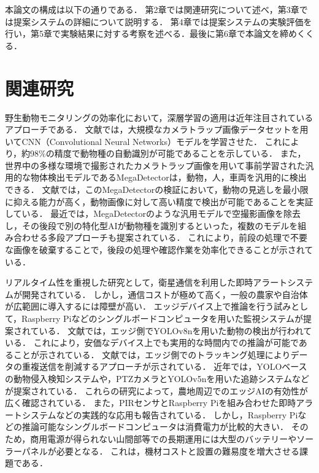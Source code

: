\documentclass[technicalreport]{ieicej}
\begin{document}
本論文の構成は以下の通りである．
第2章では関連研究について述べ，第3章では提案システムの詳細について説明する．
第4章では提案システムの実験評価を行い，第5章で実験結果に対する考察を述べる．最後に第6章で本論文を締めくくる．

\section{関連研究}

野生動物モニタリングの効率化において，深層学習の適用は近年注目されているアプローチである．
文献\cite{Tabak2019}では，大規模なカメラトラップ画像データセットを用いてCNN（Convolutional Neural Networks）モデルを学習させた．
これにより，約98\%の精度で動物種の自動識別が可能であることを示している．
また，世界中の多様な環境で撮影されたカメラトラップ画像を用いて事前学習された汎用的な物体検出モデルであるMegaDetector\cite{Beery2019}は，動物，人，車両を汎用的に検出できる．
文献\cite{Fennell2022}では，このMegaDetectorの検証において，動物の見逃しを最小限に抑える能力が高く，動物画像に対して高い精度で検出が可能であることを実証している．
最近では，MegaDetectorのような汎用モデルで空撮影画像を除去し，その後段で別の特化型AIが動物種を識別するといった，複数のモデルを組み合わせる多段アプローチも提案されている\cite{rs18030502,Mulero2025}．
これにより，前段の処理で不要な画像を破棄することで，後段の処理や確認作業を効率化できることが示されている．

リアルタイム性を重視した研究として，衛星通信を利用した即時アラートシステムが開発されている\cite{Whytock2023}．
しかし，通信コストが極めて高く，一般の農家や自治体が広範囲に導入するには障壁が高い．
エッジデバイス上で推論を行う試みとして，Raspberry Piなどのシングルボードコンピュータを用いた監視システムが提案されている\cite{Patkar2025,Computers2025}．
文献\cite{Patkar2025}では，エッジ側でYOLOv8nを用いた動物の検出が行われている．
これにより，安価なデバイス上でも実用的な時間内での推論が可能であることが示されている．
文献\cite{Computers2025}では，エッジ側でのトラッキング処理によりデータの重複送信を削減するアプローチが示されている．
近年では，YOLOベースの動物侵入検知システム\cite{10716895,11459678}や，PTZカメラとYOLOv5nを用いた追跡システム\cite{SMC2024}などが提案されている．
これらの研究によって，農地周辺でのエッジAIの有効性が広く確認されている．
また，PIRセンサとRaspberry Piを組み合わせた即時アラートシステム\cite{11337723}などの実践的な応用も報告されている．
しかし，Raspberry Piなどの推論可能なシングルボードコンピュータは消費電力が比較的大きい．
そのため，商用電源が得られない山間部等での長期運用には大型のバッテリーやソーラーパネルが必要となる．
これは，機材コストと設置の難易度を増大させる課題である\cite{IEICE2020,Sato2022}．
\end{document}
